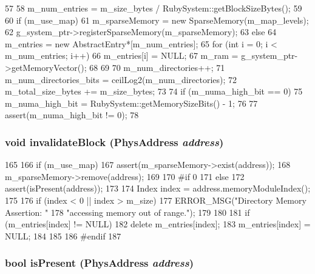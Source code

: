 \begin{DoxyCode}
57 {
58     m_num_entries = m_size_bytes / RubySystem::getBlockSizeBytes();
59 
60     if (m_use_map) {
61         m_sparseMemory = new SparseMemory(m_map_levels);
62         g_system_ptr->registerSparseMemory(m_sparseMemory);
63     } else {
64         m_entries = new AbstractEntry*[m_num_entries];
65         for (int i = 0; i < m_num_entries; i++)
66             m_entries[i] = NULL;
67         m_ram = g_system_ptr->getMemoryVector();
68     }
69 
70     m_num_directories++;
71     m_num_directories_bits = ceilLog2(m_num_directories);
72     m_total_size_bytes += m_size_bytes;
73 
74     if (m_numa_high_bit == 0) {
75         m_numa_high_bit = RubySystem::getMemorySizeBits() - 1;
76     }
77     assert(m_numa_high_bit != 0);
78 }
\end{DoxyCode}
\hypertarget{classDirectoryMemory_a6c0a228f895daabbc3860a471a999d5e}{
\subsubsection[{invalidateBlock}]{\setlength{\rightskip}{0pt plus 5cm}void invalidateBlock ({\bf PhysAddress} {\em address})}}
\label{classDirectoryMemory_a6c0a228f895daabbc3860a471a999d5e}



\begin{DoxyCode}
165 {
166     if (m_use_map) {
167         assert(m_sparseMemory->exist(address));
168         m_sparseMemory->remove(address);
169     }
170 #if 0
171     else {
172         assert(isPresent(address));
173 
174         Index index = address.memoryModuleIndex();
175 
176         if (index < 0 || index > m_size) {
177             ERROR_MSG("Directory Memory Assertion: "
178                       "accessing memory out of range.");
179         }
180 
181         if (m_entries[index] != NULL){
182             delete m_entries[index];
183             m_entries[index] = NULL;
184         }
185     }
186 #endif
187 }
\end{DoxyCode}
\hypertarget{classDirectoryMemory_a7b2f16669427e1b3e12d4ce637ebdfe3}{
\subsubsection[{isPresent}]{\setlength{\rightskip}{0pt plus 5cm}bool isPresent ({\bf PhysAddress} {\em address})}}
\label{classDirectoryMemory_a7b2f16669427e1b3e12d4ce637ebdfe3}



